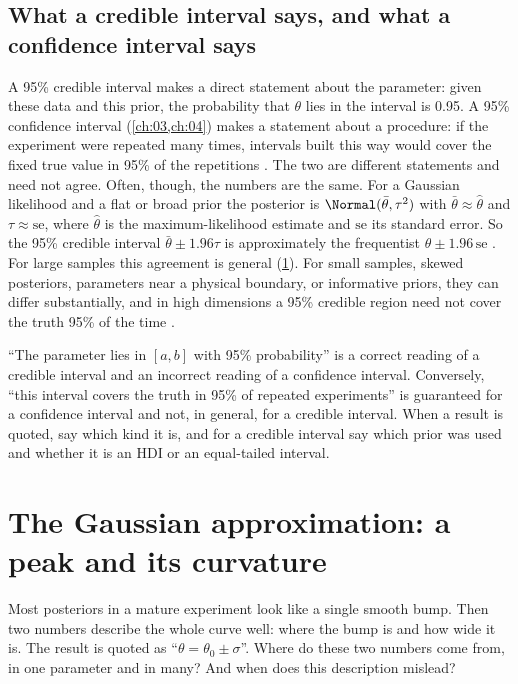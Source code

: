 \subsection{What a credible interval says, and what a confidence interval says}

A 95\% credible interval makes a direct statement about the parameter: given these data
and this prior, the probability that $\theta$ lies in the interval is 0.95. A 95\%
confidence interval (\cref{ch:03,ch:04}) makes a statement about a procedure: if the
experiment were repeated many times, intervals built this way would cover the fixed true
value in 95\% of the repetitions . The two are different
statements and need not agree. Often, though, the numbers are the same. For a
Gaussian likelihood and a flat or broad prior the posterior is $\Normal(\bar\theta,\tau^2)$ with
$\bar\theta\approx\hat\theta$ and $\tau\approx\mathrm{se}$, where $\hat\theta$ is the
maximum-likelihood estimate and $\mathrm{se}$ its standard error. So the 95\% credible
interval $\bar\theta\pm1.96\tau$ is approximately the frequentist $\hat\theta\pm1.96\,
\mathrm{se}$ . For large samples this agreement is general
(\cref{5b:sec:laplace}). For small samples, skewed posteriors, parameters near a
physical boundary, or informative priors, they can differ substantially, and in high
dimensions a 95\% credible region need not cover the truth 95\% of the time
.

\begin{pitfall}
``The parameter lies in $[a,b]$ with 95\% probability'' is a correct reading of a
credible interval and an incorrect reading of a confidence interval. Conversely,
``this interval covers the truth in 95\% of repeated experiments'' is guaranteed for a
confidence interval and not, in general, for a credible interval. When a result is
quoted, say which kind it is, and for a credible interval say which prior was used and
whether it is an HDI or an equal-tailed interval.
\end{pitfall}
\section{The Gaussian approximation: a peak and its curvature}
\label{5b:sec:laplace}

Most posteriors in a mature experiment look like a single smooth bump. Then two numbers
describe the whole curve well: where the bump is and how wide it is. The result is
quoted as ``$\theta=\theta_0\pm\sigma$''. Where do these two numbers come from, in one
parameter and in many? And when does this description mislead?

